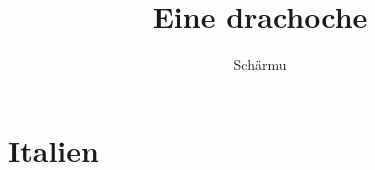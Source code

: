 \documentclass[a5paper,twoside]{scrbook}
\begin{document}
    \title{Eine drachoche}
    \author{Schärmu}
    \frontmatter
    \maketitle
    \tableofcontents
    \mainmatter
    \chapter{Italien}
\end{document}
